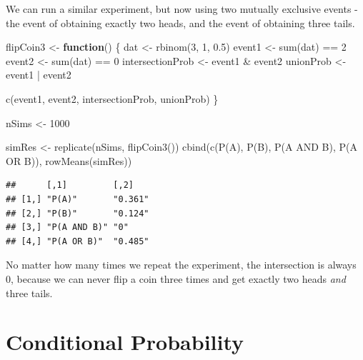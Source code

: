\documentclass[
]{book}
\newenvironment{Shaded}{\begin{snugshade}}{\end{snugshade}}
\newcommand{\ControlFlowTok}[1]{\textcolor[rgb]{0.13,0.29,0.53}{\textbf{#1}}}
\newcommand{\DecValTok}[1]{\textcolor[rgb]{0.00,0.00,0.81}{#1}}
\newcommand{\FloatTok}[1]{\textcolor[rgb]{0.00,0.00,0.81}{#1}}
\newcommand{\FunctionTok}[1]{\textcolor[rgb]{0.00,0.00,0.00}{#1}}
\newcommand{\NormalTok}[1]{#1}
\newcommand{\OtherTok}[1]{\textcolor[rgb]{0.56,0.35,0.01}{#1}}
\newcommand{\SpecialCharTok}[1]{\textcolor[rgb]{0.00,0.00,0.00}{#1}}
\newcommand{\StringTok}[1]{\textcolor[rgb]{0.31,0.60,0.02}{#1}}
\theoremstyle{definition}
\theoremstyle{definition}
\theoremstyle{definition}
\theoremstyle{remark}
\begin{document}
We can run a similar experiment, but now using two mutually exclusive events - the event of obtaining exactly two heads, and the event of obtaining three tails.

\begin{Shaded}
\begin{Highlighting}[]
\NormalTok{flipCoin3 }\OtherTok{\textless{}{-}} \ControlFlowTok{function}\NormalTok{() \{}
\NormalTok{    dat }\OtherTok{\textless{}{-}} \FunctionTok{rbinom}\NormalTok{(}\DecValTok{3}\NormalTok{, }\DecValTok{1}\NormalTok{, }\FloatTok{0.5}\NormalTok{)}
\NormalTok{    event1 }\OtherTok{\textless{}{-}} \FunctionTok{sum}\NormalTok{(dat) }\SpecialCharTok{==} \DecValTok{2}
\NormalTok{    event2 }\OtherTok{\textless{}{-}} \FunctionTok{sum}\NormalTok{(dat) }\SpecialCharTok{==} \DecValTok{0}
\NormalTok{    intersectionProb }\OtherTok{\textless{}{-}}\NormalTok{ event1 }\SpecialCharTok{\&}\NormalTok{ event2}
\NormalTok{    unionProb }\OtherTok{\textless{}{-}}\NormalTok{ event1 }\SpecialCharTok{|}\NormalTok{ event2}
    
   \FunctionTok{c}\NormalTok{(event1, event2, intersectionProb, unionProb)}
\NormalTok{\}}

\NormalTok{nSims }\OtherTok{\textless{}{-}} \DecValTok{1000}

\NormalTok{simRes }\OtherTok{\textless{}{-}} \FunctionTok{replicate}\NormalTok{(nSims, }\FunctionTok{flipCoin3}\NormalTok{())}
\FunctionTok{cbind}\NormalTok{(}\FunctionTok{c}\NormalTok{(}\StringTok{\textquotesingle{}P(A)\textquotesingle{}}\NormalTok{, }\StringTok{\textquotesingle{}P(B)\textquotesingle{}}\NormalTok{, }\StringTok{\textquotesingle{}P(A AND B)\textquotesingle{}}\NormalTok{, }\StringTok{\textquotesingle{}P(A OR B)\textquotesingle{}}\NormalTok{), }\FunctionTok{rowMeans}\NormalTok{(simRes))}
\end{Highlighting}
\end{Shaded}

\begin{verbatim}
##      [,1]         [,2]   
## [1,] "P(A)"       "0.361"
## [2,] "P(B)"       "0.124"
## [3,] "P(A AND B)" "0"    
## [4,] "P(A OR B)"  "0.485"
\end{verbatim}

No matter how many times we repeat the experiment, the intersection is always 0, because we can never flip a coin three times and get exactly two heads \emph{and} three tails.

\hypertarget{ch4_s3}{%
\section{Conditional Probability}\label{ch4_s3}}
\end{document}
